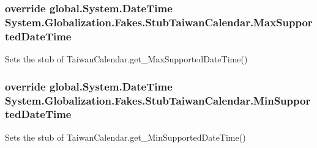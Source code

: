 \hypertarget{class_system_1_1_globalization_1_1_fakes_1_1_stub_taiwan_calendar_a3a69745df8befbb696a646edce7fb3be}{
\subsubsection[{Max\-Supported\-Date\-Time}]{\setlength{\rightskip}{0pt plus 5cm}override global.\-System.\-Date\-Time System.\-Globalization.\-Fakes.\-Stub\-Taiwan\-Calendar.\-Max\-Supported\-Date\-Time\hspace{0.3cm}{\ttfamily [get]}}}\label{class_system_1_1_globalization_1_1_fakes_1_1_stub_taiwan_calendar_a3a69745df8befbb696a646edce7fb3be}


Sets the stub of Taiwan\-Calendar.\-get\-\_\-\-Max\-Supported\-Date\-Time()

\hypertarget{class_system_1_1_globalization_1_1_fakes_1_1_stub_taiwan_calendar_a875e3cc2b0d11118876b797f3208720b}{
\subsubsection[{Min\-Supported\-Date\-Time}]{\setlength{\rightskip}{0pt plus 5cm}override global.\-System.\-Date\-Time System.\-Globalization.\-Fakes.\-Stub\-Taiwan\-Calendar.\-Min\-Supported\-Date\-Time\hspace{0.3cm}{\ttfamily [get]}}}\label{class_system_1_1_globalization_1_1_fakes_1_1_stub_taiwan_calendar_a875e3cc2b0d11118876b797f3208720b}


Sets the stub of Taiwan\-Calendar.\-get\-\_\-\-Min\-Supported\-Date\-Time()


